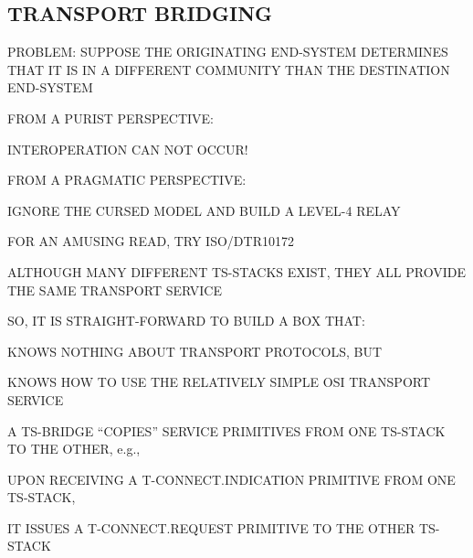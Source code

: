 \begin{bwslide}
\part*	{TRANSPORT BRIDGING}\bf

\begin{nrtc}
\item	PROBLEM: SUPPOSE THE ORIGINATING END-SYSTEM DETERMINES THAT
	IT IS IN A DIFFERENT COMMUNITY THAN THE DESTINATION END-SYSTEM

\item	FROM A PURIST PERSPECTIVE:
    \begin{nrtc}
    \item	INTEROPERATION CAN NOT OCCUR!
    \end{nrtc}

\item	FROM A PRAGMATIC PERSPECTIVE:
    \begin{nrtc}
    \item	IGNORE THE CURSED MODEL AND BUILD A LEVEL-4 RELAY
    \end{nrtc}

\item	FOR AN AMUSING READ, TRY ISO/DTR10172
\end{nrtc}
\end{bwslide}


\begin{bwslide}

\begin{nrtc}
\item	ALTHOUGH MANY DIFFERENT TS-STACKS EXIST,
	THEY ALL PROVIDE THE SAME TRANSPORT SERVICE

\item	SO, IT IS STRAIGHT-FORWARD TO BUILD A BOX THAT:
    \begin{nrtc}
    \item	KNOWS NOTHING ABOUT TRANSPORT PROTOCOLS, BUT

    \item	KNOWS HOW TO USE THE RELATIVELY SIMPLE OSI TRANSPORT SERVICE
    \end{nrtc}

\item	A TS-BRIDGE ``COPIES'' SERVICE PRIMITIVES FROM ONE TS-STACK TO THE
	OTHER, e.g.,
    \begin{nrtc}
    \item	UPON RECEIVING A T-CONNECT.INDICATION PRIMITIVE FROM ONE
		TS-STACK,

    \item	IT ISSUES A T-CONNECT.REQUEST PRIMITIVE TO THE OTHER TS-STACK
    \end{nrtc}
\end{nrtc}
\end{bwslide}


